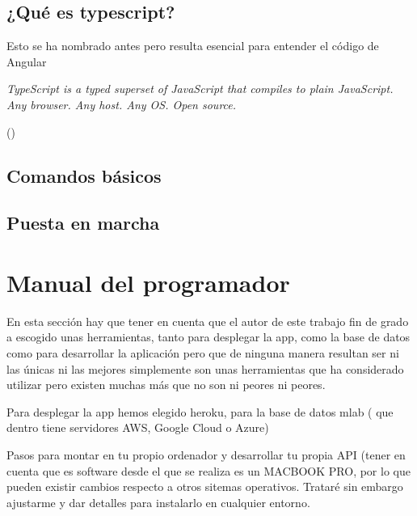 \subsection{¿Qué es typescript?}\label{typesript}
Esto se ha nombrado antes pero resulta esencial para entender el código de Angular

\begin{center}
    \begin{minipage}{0.9\linewidth}
        \vspace{5pt}%
        {\small
            \emph{TypeScript is a typed superset of JavaScript that compiles to plain JavaScript. Any browser. Any host. Any OS. Open source.}
        }
        \begin{flushright}
            (\cite{TypeScript Web})
        \end{flushright}
        \vspace{5pt}%
    \end{minipage}
\end{center}

\subsection{Comandos básicos}\label{cbasicos}

\subsection{Puesta en marcha}\label{typesript}


\section{Manual del programador}
En esta sección hay que tener en cuenta que el autor de este trabajo fin de grado a escogido unas herramientas, tanto para desplegar la app, como la base de datos como para desarrollar la aplicación pero que de ninguna manera resultan ser ni las únicas ni las mejores simplemente son unas herramientas que ha considerado utilizar pero existen muchas más que no son ni peores ni peores. 

Para desplegar la app hemos elegido heroku, para la base de datos mlab ( que dentro tiene servidores AWS, Google Cloud o Azure)

Pasos para montar en tu propio ordenador y desarrollar tu propia API (tener en cuenta que es software desde el que se realiza es un MACBOOK PRO, por lo que pueden existir cambios respecto a otros sitemas operativos. Trataré sin embargo ajustarme y dar detalles para instalarlo en cualquier entorno.

